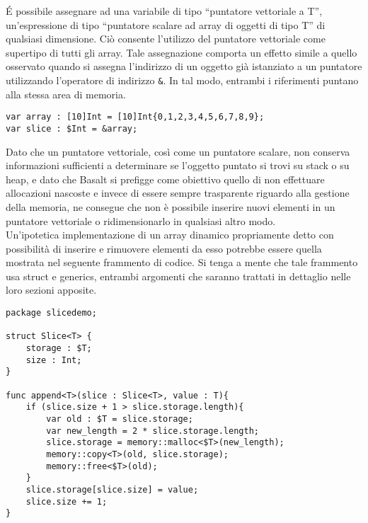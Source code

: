É possibile assegnare ad una variabile di tipo “puntatore vettoriale a T”, un’espressione di tipo “puntatore scalare ad array di oggetti di tipo T” 
di qualsiasi dimensione. Ciò consente l'utilizzo del puntatore vettoriale come supertipo di tutti gli array. Tale assegnazione 
comporta un effetto simile a quello osservato quando si assegna l'indirizzo di un oggetto già istanziato a un puntatore utilizzando 
l'operatore di indirizzo \texttt{\&}. In tal modo, entrambi i riferimenti puntano alla stessa area di memoria. \\

\vspace{0.5cm}
\begin{lstlisting}[frame=single]
var array : [10]Int = [10]Int{0,1,2,3,4,5,6,7,8,9};
var slice : $Int = &array;
\end{lstlisting}
\vspace{0.5cm}

Dato che un puntatore vettoriale, così come un puntatore scalare, non conserva informazioni sufficienti a determinare se 
l’oggetto puntato si trovi su stack o su heap, e dato che Basalt si prefigge come obiettivo quello di non 
effettuare allocazioni nascoste e invece di essere sempre trasparente riguardo alla gestione della memoria, ne consegue che non 
è possibile inserire nuovi elementi in un puntatore vettoriale o ridimensionarlo in qualsiasi altro modo. \\

Un’ipotetica implementazione di un array dinamico propriamente detto con possibilità di 
inserire e rimuovere elementi da esso potrebbe essere quella mostrata nel seguente frammento di codice. 
Si tenga a mente che tale frammento usa struct e generics, entrambi argomenti che saranno trattati in 
dettaglio nelle loro sezioni apposite. \\


\vspace{0.5cm}
\begin{lstlisting}[frame=single]
package slicedemo;

struct Slice<T> {
    storage : $T;
    size : Int;
}

func append<T>(slice : Slice<T>, value : T){
    if (slice.size + 1 > slice.storage.length){
        var old : $T = slice.storage; 
        var new_length = 2 * slice.storage.length;
        slice.storage = memory::malloc<$T>(new_length);
        memory::copy<T>(old, slice.storage);
        memory::free<$T>(old);
    }
    slice.storage[slice.size] = value;
    slice.size += 1;
}
\end{lstlisting}
\vspace{0.5cm}